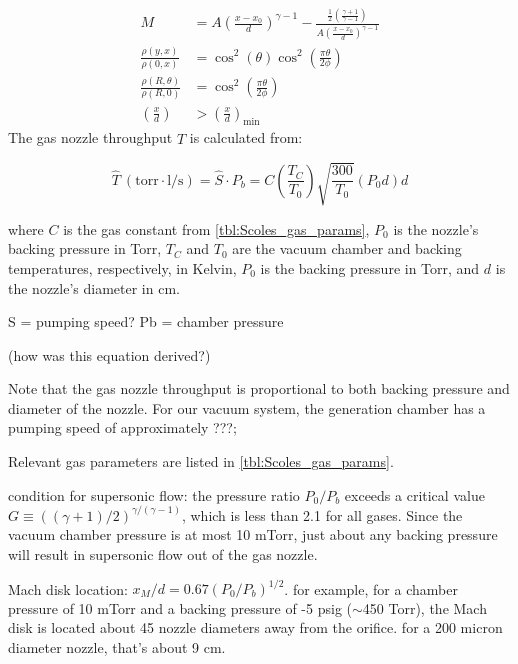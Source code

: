 \begin{subequations}
	\label{eqn:Scoles_centerline2.1}
	\begin{align}
		M &= A \left( \frac{x-x_0}{d}\right)^{\gamma-1} - \frac{\frac{1}{2} \left( \frac{\gamma+1}{\gamma-1} \right)}{A \left(\frac{x-x_0}{d} \right)^{\gamma-1}} \label{eqn:gas_mach} \\
		\frac{\rho(y,x)}{\rho(0,x)} &= \cos^2(\theta) \cos^2\left(\frac{\pi\theta}{2\phi}\right) \\
		\frac{\rho(R,\theta)}{\rho(R,0)} &= \cos^2\left(\frac{\pi\theta}{2\phi}\right) \\
		\left(\frac{x}{d} \right) &> \left( \frac{x}{d} \right)_{\text{min}} \label{eqn:mach_cond}
	\end{align}
\end{subequations}
The gas nozzle throughput $\hat{T}$ is calculated from:


\begin{equation}
\hat{T} \ (\text{torr} \cdot \text{l}/\text{s}) = \hat{S} \cdot P_b = C \left(\frac{T_C}{T_0} \right)\sqrt{\frac{300}{T_0}}(P_0 d) d
\label{eqn:nozzle_thruput}
\end{equation}

where $C$ is the gas constant from \cref{tbl:Scoles_gas_params}, $P_0$ is the nozzle's backing pressure in Torr, $T_C$ and $T_0$ are the vacuum chamber and backing temperatures, respectively, in Kelvin, $P_0$ is the backing pressure in Torr, and $d$ is the nozzle's diameter in cm.

S = pumping speed?
Pb = chamber pressure

(how was this equation derived?)

Note that the gas nozzle throughput is proportional to both backing pressure and diameter of the nozzle. For our vacuum system, the generation chamber has a pumping speed of approximately ???; 

Relevant gas parameters are listed in \cref{tbl:Scoles_gas_params}.

condition for supersonic flow: the pressure ratio $P_0 / P_b$ exceeds a critical value $G \equiv ((\gamma+1)/2)^{\gamma/(\gamma-1)}$, which is less than 2.1 for all gases. Since the vacuum chamber pressure is at most 10 mTorr, just about any backing pressure will result in supersonic flow out of the gas nozzle.

Mach disk location: $x_M / d = 0.67(P_0/P_b)^{1/2}$. for example, for a chamber pressure of 10 mTorr and a backing pressure of -5 psig ($\sim$450 Torr), the Mach disk is located about 45 nozzle diameters away from the orifice. for a 200 micron diameter nozzle, that's about 9 cm.

